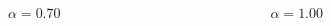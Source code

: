 \documentclass[10pt,xcolor=dvipsnames]{beamer}
\begin{document}
\begin{frame}
\begin{columns}
\begin{column}{0.55\textwidth}
   $\alpha = 0.70$
\end{column}
\begin{column}{0.295\textwidth}
\centering
  
   $\alpha = 1.00$
\end{column}
\end{columns}

\end{frame}
\end{document}
